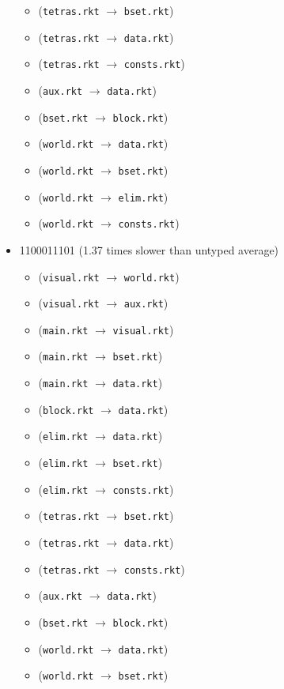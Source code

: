 \documentclass{article}
\newcommand{\mono}[1]{\texttt{#1}}
\begin{document}
\begin{itemize}
\begin{itemize}
  \item (\mono{tetras.rkt} $\rightarrow$ \mono{bset.rkt})
  \item (\mono{tetras.rkt} $\rightarrow$ \mono{data.rkt})
  \item (\mono{tetras.rkt} $\rightarrow$ \mono{consts.rkt})
  \item (\mono{aux.rkt} $\rightarrow$ \mono{data.rkt})
  \item (\mono{bset.rkt} $\rightarrow$ \mono{block.rkt})
  \item (\mono{world.rkt} $\rightarrow$ \mono{data.rkt})
  \item (\mono{world.rkt} $\rightarrow$ \mono{bset.rkt})
  \item (\mono{world.rkt} $\rightarrow$ \mono{elim.rkt})
  \item (\mono{world.rkt} $\rightarrow$ \mono{consts.rkt})
  \end{itemize}
\item 1100011101 (1.37 times slower than untyped average)
  \begin{itemize}
  \item (\mono{visual.rkt} $\rightarrow$ \mono{world.rkt})
  \item (\mono{visual.rkt} $\rightarrow$ \mono{aux.rkt})
  \item (\mono{main.rkt} $\rightarrow$ \mono{visual.rkt})
  \item (\mono{main.rkt} $\rightarrow$ \mono{bset.rkt})
  \item (\mono{main.rkt} $\rightarrow$ \mono{data.rkt})
  \item (\mono{block.rkt} $\rightarrow$ \mono{data.rkt})
  \item (\mono{elim.rkt} $\rightarrow$ \mono{data.rkt})
  \item (\mono{elim.rkt} $\rightarrow$ \mono{bset.rkt})
  \item (\mono{elim.rkt} $\rightarrow$ \mono{consts.rkt})
  \item (\mono{tetras.rkt} $\rightarrow$ \mono{bset.rkt})
  \item (\mono{tetras.rkt} $\rightarrow$ \mono{data.rkt})
  \item (\mono{tetras.rkt} $\rightarrow$ \mono{consts.rkt})
  \item (\mono{aux.rkt} $\rightarrow$ \mono{data.rkt})
  \item (\mono{bset.rkt} $\rightarrow$ \mono{block.rkt})
  \item (\mono{world.rkt} $\rightarrow$ \mono{data.rkt})
  \item (\mono{world.rkt} $\rightarrow$ \mono{bset.rkt})

\end{itemize}
\end{itemize}
\end{document}
